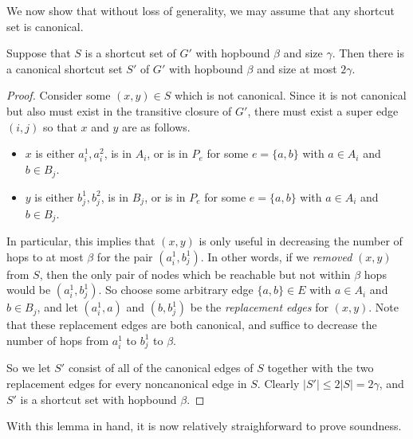We now show that without loss of generality, we may assume that any shortcut set is canonical.

\begin{lemma} \label{lem:canonical}
    Suppose that $S$ is a shortcut set of $G'$ with hopbound $\beta$ and size $\gamma$.  Then there is a canonical shortcut set $S'$ of $G'$ with hopbound $\beta$ and size at most $2 \gamma$.
\end{lemma}
\begin{proof}
    Consider some $(x,y) \in S$ which is not canonical.  Since it is not canonical but also must exist in the transitive closure of $G'$, there must exist a super edge $(i,j)$ so that $x$ and $y$ are as follows.
    \begin{itemize}
        \item $x$ is either $a_i^1, a_i^2$, is in $A_i$, or is in $P_e$ for some $e = \{a,b\}$ with $a \in A_i$ and $b \in B_j$.
        \item $y$ is either $b_j^1, b_j^2$, is in $B_j$, or is in $P_e$ for some $e = \{a,b\}$ with $a \in A_i$ and $b \in B_j$.
    \end{itemize}
    In particular, this implies that $(x,y)$ is only useful in decreasing the number of hops to at most $\beta$ for the pair $(a_i^1, b_j^1)$.  In other words, if we \emph{removed} $(x,y)$ from $S$, then the only pair of nodes which be reachable but not within $\beta$ hops would be $(a_i^1, b_j^1)$.  So choose some arbitrary edge $\{a,b\} \in E$ with $a \in A_i$ and $b \in B_j$, and let $(a_i^1, a)$ and $(b, b_j^1)$ be the \emph{replacement edges} for $(x,y)$.  Note that these replacement edges are both canonical, and suffice to decrease the number of hops from $a_i^1$ to $b_j^1$ to $\beta$.

    So we let $S'$ consist of all of the canonical edges of $S$ together with the two replacement edges for every noncanonical edge in $S$.  Clearly $|S'| \leq 2|S| =2\gamma$, and $S'$ is a shortcut set with hopbound $\beta$.  
\end{proof}

With this lemma in hand, it is now relatively straighforward to prove soundness.

